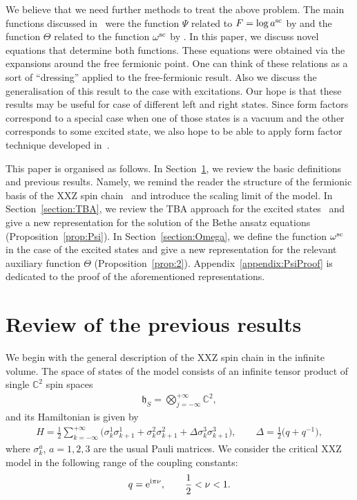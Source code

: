 \documentclass[pdftex]{sigma}
\numberwithin{equation}{section}
\begin{document}
We believe that we need further methods to treat the above problem. The main functions discussed in~\cite{Boos_TBAE, HGS_4}  were the function $\Psi$ related to $F=\log{a^{{\rm sc}}}$ by \cite[formula~(10.9)]{HGS_4} and the function $\Theta$ related to the function $\omega^{{\rm sc}}$ by \cite[formula~(11.5)]{HGS_4}. In this paper, we discuss novel equations that determine both functions. These equations were obtained via the expansions around the free fermionic point. One can think of these relations as a sort of ``dressing'' applied to the free-fermionic result. Also we discuss the generalisation of this result to the case with excitations. Our hope is that these results may be useful for case of different left and right states. Since form factors correspond to a special case when one of those states is a vacuum and the other corresponds to some excited state, we also hope to be able to apply form factor technique developed in~\cite{Smirnov_1992}.

This paper is organised as follows. In Section~\ref{section:Review}, we review the basic definitions and previous results. Namely, we remind the reader the structure of the fermionic basis of the XXZ spin chain~\cite{HGS_4, HGS_1, HGS_2, HGS_3} and introduce the scaling limit of the model. In Section~\ref{section:TBA}, we review the TBA approach for the excited states~\cite{BG_2009} and give a new representation for the solution of the Bethe ansatz equations (Proposition~\ref{prop:Psi}). In Section~\ref{section:Omega}, we define the function $\omega^{{\rm sc}}$ in the case of the excited states and give a new representation for the relevant auxiliary function $\Theta$ (Proposition~\ref{prop:2}). Appendix~\ref{appendix:PsiProof} is dedicated to the proof of the aforementioned representations.

\section{Review of the previous results}\label{section:Review}

We begin with the general description of the XXZ spin chain in the infinite volume. The space of states of the model consists of an infinite tensor product of single $\mathbb{C}^2$ spin spaces
\begin{align*}
\mathfrak{h}_{S}=\bigotimes\limits_{j=-\infty}^{+\infty} \mathbb{C}^2,
\end{align*}
and its Hamiltonian is given by
\begin{align*}
H=\frac{1}{2}\sum_{k=-\infty}^{+\infty} \bigl(\sigma_{k}^{1}\sigma_{k+1}^{1}+\sigma_{k}^{2}\sigma_{k+1}^{2}+\Delta\sigma_{k}^{3}\sigma_{k+1}^{3}\bigr),
\qquad
\Delta=\frac{1}{2}\bigl(q+q^{-1}\bigr),
\end{align*}
where $\sigma_k^{a}$, $a=1, 2, 3$ are the usual Pauli matrices. We consider the critical XXZ model in the following range of the coupling constants:
\begin{align*}
q={\rm e}^{{\rm i}\pi\nu}, \qquad \frac{1}{2}<\nu<1.
\end{align*}
\end{document}
